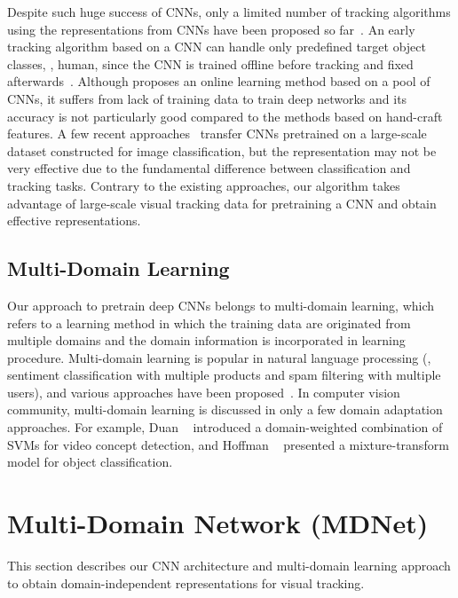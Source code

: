 \documentclass[10pt,twocolumn,letterpaper]{article}
\begin{document}
Despite such huge success of CNNs, only a limited number of tracking algorithms using the representations from CNNs have been proposed so far~\cite{fan2010human,hong2015online,li122014deeptrack,wang2015transferring}.
An early tracking algorithm based on a CNN can handle only predefined target object classes, \eg, human, since the CNN is trained offline before tracking and fixed afterwards~\cite{fan2010human}.
Although \cite{li122014deeptrack} proposes an online learning method based on a pool of CNNs, it suffers from lack of training data to train deep networks and its accuracy is not particularly good compared to the methods based on hand-craft features.
A few recent approaches~\cite{wang2015transferring,hong2015online} transfer CNNs pretrained on a large-scale dataset constructed for image classification, but the representation may not be very effective due to the fundamental difference between classification and tracking tasks. 
Contrary to the existing approaches, our algorithm takes advantage of large-scale visual tracking data for pretraining a CNN and obtain effective representations.

\subsection{Multi-Domain Learning}
\label{sub:multi-domain}
Our approach to pretrain deep CNNs belongs to multi-domain learning, which refers to a learning method in which the training data are originated from multiple domains and the domain information is incorporated in learning procedure. 
Multi-domain learning is popular in natural language processing (\eg, sentiment classification with multiple products and spam filtering with multiple users), and various approaches have been proposed~\cite{daume2009frustratingly,dredze2010multi,joshi2012multi}. 
In computer vision community, multi-domain learning is discussed in only a few domain adaptation approaches. 
For example, Duan \etal~\cite{duan2009domain} introduced a domain-weighted combination of SVMs for video concept detection, and Hoffman \etal~\cite{hoffman2012discovering} presented a mixture-transform model for object classification. 


\section{Multi-Domain Network (MDNet)}
\label{sec:multi-domain}
This section describes our CNN architecture and multi-domain learning approach to obtain domain-independent representations for visual tracking.
\end{document}

